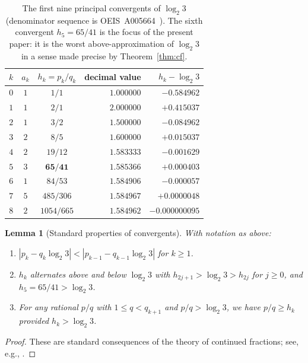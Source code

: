 \documentclass[11pt,a4paper]{article}
\newtheorem{lemma}[theorem]{Lemma}
\theoremstyle{definition}
\theoremstyle{remark}
\begin{document}
\begin{table}[htbp]
\centering
\renewcommand{\arraystretch}{1.15}
\begin{tabular}{c c c r r}
\toprule
$k$ & $a_k$ & $h_k = p_k/q_k$ & decimal value & $h_k - \log_2 3$ \\
\midrule
$0$ & $1$ & $1/1$ & $1.000000$ & $-0.584962$ \\
$1$ & $1$ & $2/1$ & $2.000000$ & $+0.415037$ \\
$2$ & $1$ & $3/2$ & $1.500000$ & $-0.084962$ \\
$3$ & $2$ & $8/5$ & $1.600000$ & $+0.015037$ \\
$4$ & $2$ & $19/12$ & $1.583333$ & $-0.001629$ \\
$5$ & $3$ & $\mathbf{65/41}$ & $\mathbf{1.585366}$ &
  $\mathbf{+0.000403}$ \\
$6$ & $1$ & $84/53$ & $1.584906$ & $-0.000057$ \\
$7$ & $5$ & $485/306$ & $1.584967$ & $+0.0000048$ \\
$8$ & $2$ & $1054/665$ & $1.584962$ & $-0.000000095$ \\
\bottomrule
\end{tabular}
\caption{The first nine principal convergents of $\log_2 3$ (denominator
sequence is OEIS~A005664~\cite{OEIS-A005664}).  The
sixth convergent $h_5 = 65/41$ is the focus of the present paper:
it is the worst above-approximation of $\log_2 3$ in a sense made
precise by Theorem~\ref{thm:cf}.}
\label{tab:conv}
\end{table}

\begin{lemma}[Standard properties of convergents]\label{lem:cfprop}
With notation as above:
\begin{enumerate}[label=(\roman*),leftmargin=2em]
  \item $|p_k - q_k \log_2 3| < |p_{k-1} - q_{k-1} \log_2 3|$ for
    $k \geq 1$.
  \item $h_k$ alternates above and below $\log_2 3$ with
    $h_{2j+1} > \log_2 3 > h_{2j}$ for $j \geq 0$, and
    $h_5 = 65/41 > \log_2 3$.
  \item For any rational $p/q$ with $1 \leq q < q_{k+1}$ and
    $p/q > \log_2 3$, we have $p/q \geq h_k$ provided
    $h_k > \log_2 3$.
\end{enumerate}
\end{lemma}

\begin{proof}
These are standard consequences of the theory of continued fractions;
see, e.g., \cite[Theorems~163, 181, 182]{HardyWright}.
\end{proof}
\end{document}
